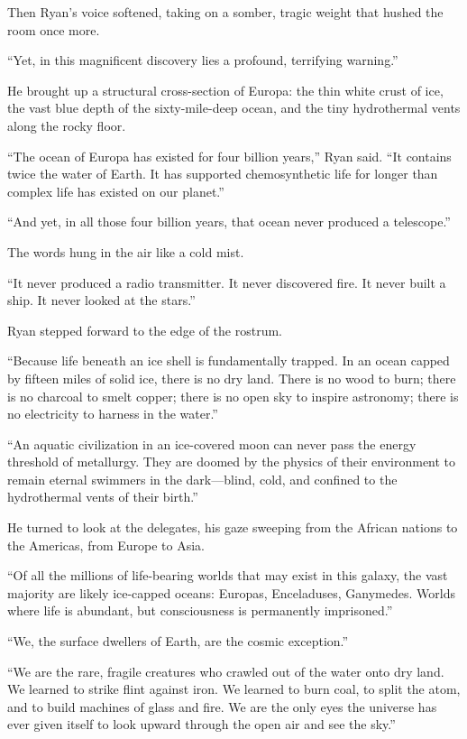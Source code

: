 \documentclass[12pt,twoside,openright]{book}
\begin{document}
Then Ryan's voice softened, taking on a somber, tragic weight that
hushed the room once more.

``Yet, in this magnificent discovery lies a profound, terrifying
warning.''

He brought up a structural cross-section of Europa: the thin white crust
of ice, the vast blue depth of the sixty-mile-deep ocean, and the tiny
hydrothermal vents along the rocky floor.

``The ocean of Europa has existed for four billion years,'' Ryan said.
``It contains twice the water of Earth. It has supported chemosynthetic
life for longer than complex life has existed on our planet.''

``And yet, in all those four billion years, that ocean never produced a
telescope.''

The words hung in the air like a cold mist.

``It never produced a radio transmitter. It never discovered fire. It
never built a ship. It never looked at the stars.''

Ryan stepped forward to the edge of the rostrum.

``Because life beneath an ice shell is fundamentally trapped. In an
ocean capped by fifteen miles of solid ice, there is no dry land. There
is no wood to burn; there is no charcoal to smelt copper; there is no
open sky to inspire astronomy; there is no electricity to harness in the
water.''

``An aquatic civilization in an ice-covered moon can never pass the
energy threshold of metallurgy. They are doomed by the physics of their
environment to remain eternal swimmers in the dark---blind, cold, and
confined to the hydrothermal vents of their birth.''

He turned to look at the delegates, his gaze sweeping from the African
nations to the Americas, from Europe to Asia.

``Of all the millions of life-bearing worlds that may exist in this
galaxy, the vast majority are likely ice-capped oceans: Europas,
Enceladuses, Ganymedes. Worlds where life is abundant, but consciousness
is permanently imprisoned.''

``We, the surface dwellers of Earth, are the cosmic exception.''

``We are the rare, fragile creatures who crawled out of the water onto
dry land. We learned to strike flint against iron. We learned to burn
coal, to split the atom, and to build machines of glass and fire. We are
the only eyes the universe has ever given itself to look upward through
the open air and see the sky.''
\end{document}
